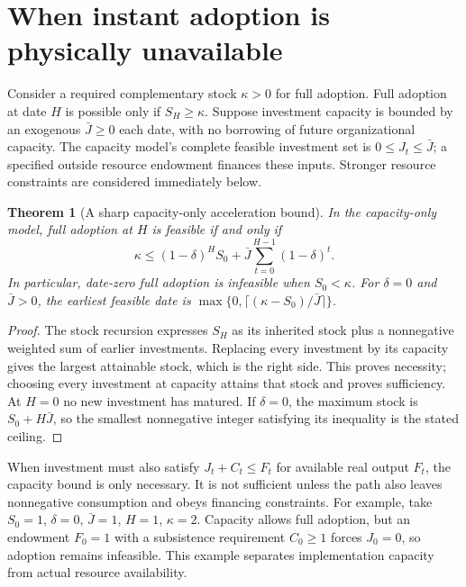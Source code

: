 \documentclass[11pt]{article}
\newtheorem{theorem}{Theorem}
\theoremstyle{remark}
\begin{document}
\section{When instant adoption is physically unavailable}
Consider a required complementary stock $\kappa>0$ for full adoption. Full adoption at date $H$ is possible only if $S_H\geq\kappa$. Suppose investment capacity is bounded by an exogenous $\bar J\geq0$ each date, with no borrowing of future organizational capacity. The capacity model's complete feasible investment set is $0\leq J_t\leq\bar J$; a specified outside resource endowment finances these inputs. Stronger resource constraints are considered immediately below.

\begin{theorem}[A sharp capacity-only acceleration bound]\label{reach}
In the capacity-only model, full adoption at $H$ is feasible if and only if
\[
 \kappa\leq(1-\delta)^HS_0+
                  \bar J\sum_{t=0}^{H-1}(1-\delta)^t.
\]
In particular, date-zero full adoption is infeasible when $S_0<\kappa$. For $\delta=0$ and $\bar J>0$, the earliest feasible date is
$\max\{0,\lceil(\kappa-S_0)/\bar J\rceil\}$.
\end{theorem}
\begin{proof}
The stock recursion expresses $S_H$ as its inherited stock plus a nonnegative weighted sum of earlier investments. Replacing every investment by its capacity gives the largest attainable stock, which is the right side. This proves necessity; choosing every investment at capacity attains that stock and proves sufficiency. At $H=0$ no new investment has matured. If $\delta=0$, the maximum stock is $S_0+H\bar J$, so the smallest nonnegative integer satisfying its inequality is the stated ceiling.
\end{proof}

When investment must also satisfy $J_t+C_t\leq F_t$ for available real output $F_t$, the capacity bound is only necessary. It is not sufficient unless the path also leaves nonnegative consumption and obeys financing constraints. For example, take $S_0=1$, $\delta=0$, $\bar J=1$, $H=1$, $\kappa=2$. Capacity allows full adoption, but an endowment $F_0=1$ with a subsistence requirement $C_0\geq1$ forces $J_0=0$, so adoption remains infeasible. This example separates implementation capacity from actual resource availability.
\end{document}
